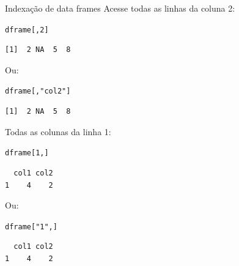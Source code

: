 \documentclass[10pt,handout]{beamer}\usepackage[]{graphicx}\usepackage[]{color}
\makeatletter
\newcommand{\hlnum}[1]{\textcolor[rgb]{0.686,0.059,0.569}{#1}}%
\newcommand{\hlstr}[1]{\textcolor[rgb]{0.282,0.239,0.545}{#1}}%
\newcommand{\hlstd}[1]{\textcolor[rgb]{0.345,0.345,0.345}{#1}}%
\newenvironment{kframe}{%
 \def\at@end@of@kframe{}%
 \ifinner\ifhmode%
  \def\at@end@of@kframe{\end{minipage}}%
  \begin{minipage}{\columnwidth}%
 \fi\fi%
 \def\FrameCommand##1{\hskip\@totalleftmargin \hskip-\fboxsep
 \colorbox{shadecolor}{##1}\hskip-\fboxsep
     \hskip-\linewidth \hskip-\@totalleftmargin \hskip\columnwidth}%
 \MakeFramed {\advance\hsize-\width
   \@totalleftmargin\z@ \linewidth\hsize
   \@setminipage}}%
 {\par\unskip\endMakeFramed%
 \at@end@of@kframe}
\newenvironment{knitrout}{}{} %
\makeatother
\begin{document}
\begin{frame}[fragile]{Indexação de data frames}
Acesse todas as linhas da coluna 2:
\begin{knitrout}\small
{}\color{fgcolor}\begin{kframe}
\begin{alltt}
\hlstd{dframe[,}\hlnum{2}\hlstd{]}
\end{alltt}
\begin{verbatim}
[1]  2 NA  5  8
\end{verbatim}
\end{kframe}
\end{knitrout}

Ou:
\begin{knitrout}\small
{}\color{fgcolor}\begin{kframe}
\begin{alltt}
\hlstd{dframe[,}\hlstr{"col2"}\hlstd{]}
\end{alltt}
\begin{verbatim}
[1]  2 NA  5  8
\end{verbatim}
\end{kframe}
\end{knitrout}

Todas as colunas da linha 1:
\begin{knitrout}\small
{}\color{fgcolor}\begin{kframe}
\begin{alltt}
\hlstd{dframe[}\hlnum{1}\hlstd{,]}
\end{alltt}
\begin{verbatim}
  col1 col2
1    4    2
\end{verbatim}
\end{kframe}
\end{knitrout}

Ou:
\begin{knitrout}\small
{}\color{fgcolor}\begin{kframe}
\begin{alltt}
\hlstd{dframe[}\hlstr{"1"}\hlstd{,]}
\end{alltt}
\begin{verbatim}
  col1 col2
1    4    2
\end{verbatim}
\end{kframe}
\end{knitrout}

\end{frame}
\end{document}
